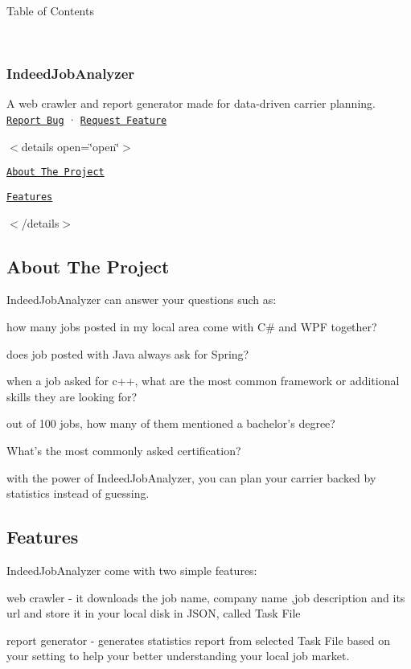 Table of Contents

~\newline
 

\subsubsection*{Indeed\+Job\+Analyzer}

A web crawler and report generator made for data-\/driven carrier planning. ~\newline
 \href{https://github.com/RileyCodes/IndeedJobAnalyzer/issues/new}{\tt Report Bug} · \href{https://github.com/RileyCodes/IndeedJobAnalyzer/issues/new}{\tt Request Feature} 

$<$details open=\char`\"{}open\char`\"{}$>$


\begin{DoxyEnumerate}
\item \href{#about-the-project}{\tt About The Project}  
\item \href{#getting-started}{\tt Features}  
\end{DoxyEnumerate}$<$/details$>$

\subsection*{About The Project}

Indeed\+Job\+Analyzer can answer your questions such as\+:


\begin{DoxyItemize}
\item how many jobs posted in my local area come with C\# and W\+P\+F together?
\item does job posted with Java always ask for Spring?
\item when a job asked for c++, what are the most common framework or additional skills they are looking for?
\item out of 100 jobs, how many of them mentioned a bachelor's degree?
\item What's the most commonly asked certification?
\end{DoxyItemize}

with the power of Indeed\+Job\+Analyzer, you can plan your carrier backed by statistics instead of guessing.

\subsection*{Features}

Indeed\+Job\+Analyzer come with two simple features\+:


\begin{DoxyItemize}
\item web crawler -\/ it downloads the job name, company name ,job description and its url and store it in your local disk in J\+S\+O\+N, called {\ttfamily Task File}
\item report generator -\/ generates statistics report from selected {\ttfamily Task File} based on your setting to help your better understanding your local job market. 
\end{DoxyItemize}